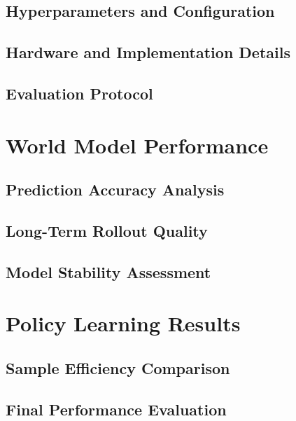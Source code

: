 \documentclass[
	english,
	ruledheaders=section,
	class=report,
	thesis={type=master},
	accentcolor=9c,
	custommargins=true,
	marginpar=false,
	parskip=half-,
	fontsize=11pt,
]{tudapub}
\begin{document}
\subsection{Hyperparameters and Configuration}
\label{subsec:hyperparameters}

\subsection{Hardware and Implementation Details}
\label{subsec:hardware}

\subsection{Evaluation Protocol}
\label{subsec:eval_protocol}

\section{World Model Performance}
\label{sec:world_model_perf}

\subsection{Prediction Accuracy Analysis}
\label{subsec:prediction_accuracy}

\subsection{Long-Term Rollout Quality}
\label{subsec:rollout_quality}

\subsection{Model Stability Assessment}
\label{subsec:stability}

\section{Policy Learning Results}
\label{sec:policy_results}

\subsection{Sample Efficiency Comparison}
\label{subsec:sample_efficiency_comp}

\subsection{Final Performance Evaluation}
\label{subsec:final_performance}
\end{document}
